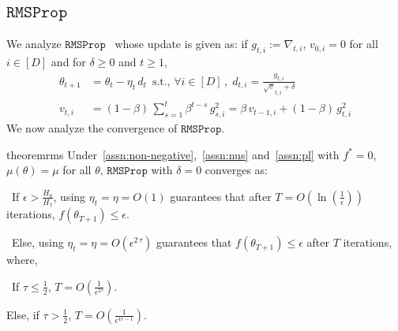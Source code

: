 \documentclass{article}
\newcommand{\ti}[1]{#1_{t,i}}
\newcommand{\tpi}[1]{#1_{t-1,i}}
\newcommand{\si}[1]{#1_{s,i}}
\newcommand{\tht}{\theta_t}
\newcommand{\thtt}{\theta_{t+1}}
\newcommand{\etat}{{\eta_t}}
\newcommand{\RMS}{\texttt{RMSProp}}
\begin{document}
\subsection{$\RMS$}
\label{sec:rms}
We analyze $\RMS$~\citep{tieleman2012lecture} whose update is given as: if $\ti{g} := \nabla_{t,i}$, $v_{0,i} = 0$ for all $i \in [D]$ and for $\delta \geq 0$ and $t \geq 1$, 
\begin{align}
\thtt &= \tht - \etat \, d_t \, \text{ s.t., } \forall i \in [D]\,, \; d_{t,i} = \frac{\ti{g}}{\ti{\sqrt{v}} + \delta} \label{eq:rmsprop-update-coordinate}  \\
\ti{v} & = (1-\beta) \, \sum_{s = 1}^t \beta^{t -s} \, \si{g^2}  = \beta \, \tpi{v} + (1-\beta) \, \ti{g^2} \nonumber
\end{align}
We now analyze the convergence of $\RMS$.  
\begin{restatable}{theorem}{rms}
Under~\cref{assn:non-negative},~\cref{assn:nus} and~\cref{assn:pl} with $f^* = 0$, $\mu(\theta) = \mu$ for all $\theta$, $\RMS$ with $\delta = 0$ converges as:

\textbullet\ If $\epsilon > \frac{H_0}{H_1}$, using $\etat = \eta = O(1)$ guarantees that after $T = O\left( \ln\left(\frac{1}{\epsilon}\right)\right)$ iterations, $f(\theta_{T+1}) \leq \epsilon$. 

\textbullet\ Else, using $\etat = \eta = O(\epsilon^{2 \, \tau})$ guarantees that $f(\theta_{T+1}) \leq \epsilon$ after $T$ iterations, where,

\hspace{3ex} \textbullet\ If $\tau \leq \frac{1}{2}$, $T = O \left( \frac{1}{\epsilon^{2 \tau}} \right)$. 

\hspace{3ex} \textbullet Else, if $\tau > \frac{1}{2}$, $T = O \left( \frac{1}{\epsilon^{4 \tau - 1}} \right)$. 
\label{thm:rms-pl}
\end{restatable}
\end{document}
